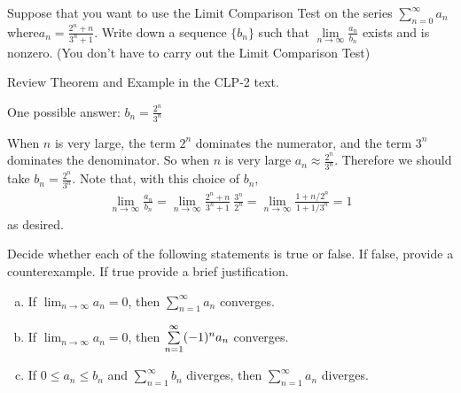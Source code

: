 \begin{question}[2016Q5]
Suppose that you want to use the Limit Comparison Test on the series
$ \displaystyle \sum_{n=0}^{\infty} a_n$ where\linebreak $\displaystyle a_n = \frac{2^n+n}{3^n+1}$.
Write down a sequence $\{b_n\}$ such that $\displaystyle \lim\limits_{n\to\infty} \frac{a_n}{b_n}$
exists and is nonzero. (You don't have to carry out the Limit Comparison Test)
\end{question}

\begin{hint}
Review  Theorem  and
Example  in the CLP-2 text.

\end{hint}

\begin{answer}
One possible answer:
$b_n=\displaystyle \frac{2^n}{3^n}$
\end{answer}

\begin{solution}
When $n$ is very large, the term $2^n$ dominates the numerator,
and the term $3^n$ dominates the denominator.  So when $n$ is very large
$a_n\approx   \frac{2^n}{3^n}$. Therefore we should  take $b_n=\displaystyle \frac{2^n}{3^n}$.
Note that, with this choice of $b_n$,
\begin{align*}
 \lim_{n\to\infty} \frac{a_n}{b_n}
= \lim_{n\to\infty} \frac{2^n+n}{3^n+1}\ \frac{3^n}{2^n}
= \lim_{n\to\infty} \frac{1+ n/2^{n}}{1+1/3^{n}}
=1
\end{align*}
as desired.
\end{solution}

\begin{Mquestion}[2014D, 2016A]
Decide whether each of the following statements is true or false.
If false, provide a counterexample. If true provide a brief justification.

\begin{enumerate}[(a)]
\item
If $\displaystyle\lim_{n\rightarrow\infty}a_n=0$,
               then $\sum\limits_{n=1}^{\infty} a_n$ converges.
\item
 If $\displaystyle\lim_{n\rightarrow\infty}a_n=0$,
               then $\sum\limits_{n=1}^{\infty} (-1)^{n\mathstrut} a_n$ converges.
\item
If $0\le a_n \le b_n$ and $\sum\limits_{n=1}^{\infty} b_n$ diverges,
then $\sum\limits_{n=1}^{\infty} a_n$ diverges.
\end{enumerate}
\end{Mquestion}

